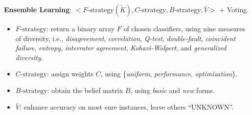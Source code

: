 {\bf Ensemble Learning}: $<F\text{-strategy}(\tilde{K}), C\text{-strategy}, B\text{-strategy}, \bar{V}>$ + Voting.


\begin{itemize}[noitemsep,topsep=1pt]
  \itemsep0.35em 
  \item $F\text{-strategy}$: return a binary array $F$ of chosen classifiers,  using nine measures of diversity, i.e., \emph{disagreement}, \emph{correlation}, \emph{Q-test}, \emph{double-fault}, \emph{coincident failure}, \emph{entropy}, \emph{interrater agreement}, \emph{Kohavi-Wolpert}, and \emph{generalized diversity}. 
  \item $C\text{-strategy}$: assign weights $C$, using \{\emph{uniform}, \emph{performance}, \emph{optimization}\}.
  \item $B\text{-strategy}$: obtain the belief matrix $B$, using \emph{basic} and \emph{new} forms.
  \item $\bar{V}$: enhance accuracy on most sure instances, leave others ``UNKNOWN''.
\end{itemize}


